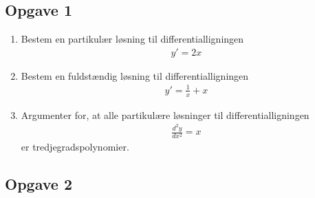 \subsection*{Opgave 1}
\begin{enumerate}[label=\roman*)]
	\item Bestem en partikulær løsning til differentialligningen 
	\begin{align*}
		y' = 2x
	\end{align*}
	\item Bestem en fuldstændig løsning til differentialligningen
	\begin{align*}
		y' = \frac{1}{x} + x
	\end{align*}
	\item Argumenter for, at alle partikulære løsninger til differentialligningen
	\begin{align*}
		\frac{d^2y}{dx^2} = x
	\end{align*}
	er tredjegradspolynomier. 
\end{enumerate}

\subsection*{Opgave 2}

